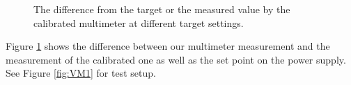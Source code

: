 \begin{figure}[h]
    \centering


    \caption{The difference from the target or the measured value by the calibrated multimeter at different target settings.}
    \label{fig:ResVoltageDelta}
    
\end{figure}
Figure \ref{fig:ResVoltageDelta} shows the difference between our multimeter measurement and the measurement of the calibrated one as well as the set point on the power supply. See Figure \ref{fig:VM1} for test setup.
